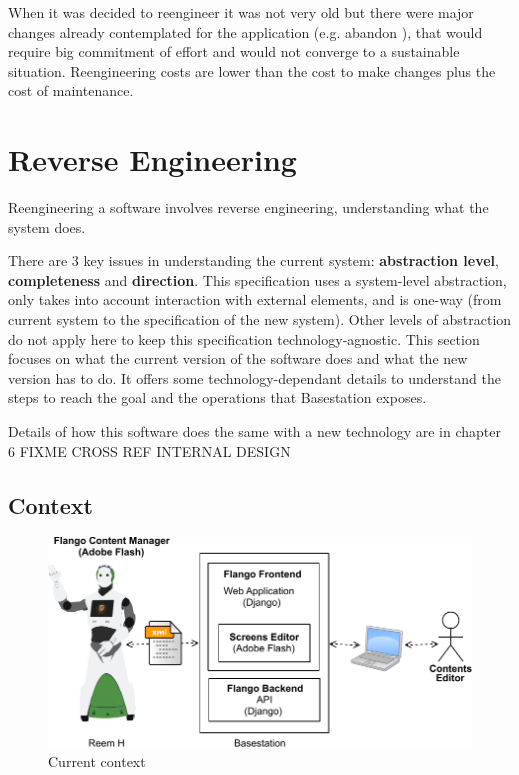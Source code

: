 When it was decided to reengineer \flangofe it was not very old but there were major changes already contemplated for the application (e.g. abandon \flash), that would require big commitment of effort and would not converge to a sustainable situation.
Reengineering costs are lower than the cost to make changes plus the cost of maintenance.

\section{Reverse Engineering}
\label{sec:context}
Reengineering a software involves reverse engineering, understanding what the system does.

There are 3 key issues in understanding the current system: \textbf{abstraction level}, \textbf{completeness} and \textbf{direction}.
This specification uses a system-level abstraction, only takes into account interaction with external elements, and is one-way (from current system to the specification of the new system).
Other levels of abstraction do not apply here to keep this specification technology-agnostic.
This section focuses on what the current version of the software does and what the new version has to do.
It offers some technology-dependant details to understand the steps to reach the goal and the operations that Basestation exposes.

Details of how this software does the same with a new technology are in chapter 6 FIXME CROSS REF INTERNAL DESIGN

\subsection{Context}
\begin{figure}[htb]
    \centering
    \includegraphics[width=\textwidth]{figures/context-original}
    \caption{Current context}
    \label{fig:context-original}
\end{figure}

